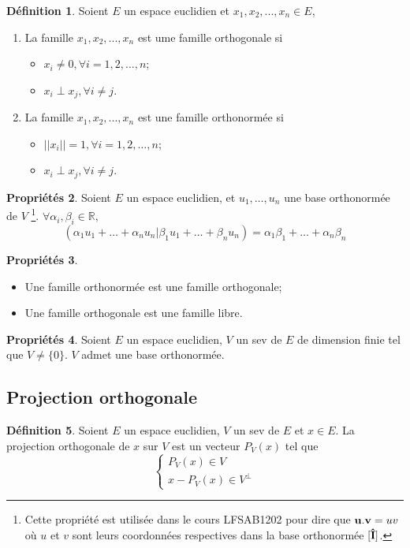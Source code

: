 \documentclass[11pt,a4paper]{article}
\theoremstyle{definition}
\newtheorem{mydef}{Définition}[section]
\newtheorem{myprop}[mydef]{Propriétés}
\newcommand*\InsertTheoremBreak{%
  \begingroup %
    \setlength\itemsep{0pt}%
    \setlength\parsep{0pt}%
    \item[\vbox{\null}]%
  \endgroup%
 }%
\begin{document}
\begin{mydef}
  Soient $E$ un espace euclidien et $x_1, x_2,... ,x_n \in E$,
  \begin{enumerate}
  \item La famille $x_1, x_2,... ,x_n$ est ume famille orthogonale si
    \begin{itemize}
    \item $x_i \neq 0, \forall i = 1, 2, \ldots, n$;
    \item $x_i \perp x_j, \forall i \neq j$.
    \end{itemize}

  \item La famille $x_1, x_2,... ,x_n$ est une famille orthonormée si
    \begin{itemize}
    \item $||x_i|| = 1, \forall i = 1, 2, \ldots, n$;
    \item $x_i \perp x_j, \forall i \neq j$.
    \end{itemize}
  \end{enumerate}
\end{mydef}

\begin{myprop}
	Soient $E$ un espace euclidien, et $u_1, \ldots, u_n$ une base orthonormée de $V$
	\footnote{Cette propriété est utilisée dans le cours LFSAB1202 pour dire que ${\bf u}.{\bf v} = uv$
	où $u$ et $v$ sont leurs coordonnées respectives dans la base orthonormée $[{\bf\hat{I}}]$.}.
	$\forall \alpha_i, \beta_i \in \mathbb{R},$
	$$(\alpha_1u_1 + \ldots + \alpha_nu_n | \beta_1u_1 + \ldots + \beta_nu_n) = \alpha_1\beta_1 + \ldots + \alpha_n\beta_n$$
\end{myprop}

\begin{myprop}\InsertTheoremBreak
	\begin{itemize}
		\item Une famille orthonormée est une famille orthogonale;
		\item Une famille orthogonale est une famille libre.
	\end{itemize}
\end{myprop}

\begin{myprop}
	Soient $E$ un espace euclidien, $V$ un sev de $E$ de dimension finie tel que $V \neq \{0\}$. $V$ admet une base orthonormée.
\end{myprop}

\subsection{Projection orthogonale}
\begin{mydef}
	Soient $E$ un espace euclidien, $V$ un sev de $E$ et $x \in E$.
	La projection orthogonale de $x$ sur $V$ est un vecteur $P_V(x)$ tel que
	\[
	\left\{
	\begin{array}{l}
		P_V(x) \in V\\
		x - P_V(x) \in V^{\perp}
	\end{array}
	\right.
	\]
\end{mydef}
\end{document}
